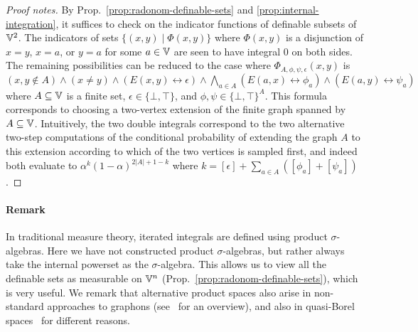 \begin{proof}[Proof notes]
  By Prop.~\ref{prop:radonom-definable-sets} and \ref{prop:internal-integration}, it suffices to check on the indicator functions of definable subsets of $\mathbb{V}^2$.
  The indicators of sets $\{(x,y) \mid \Phi(x,y)\}$ where $\Phi(x,y)$ is a disjunction of $x = y$, $x = a$, or $y = a$ for some $a \in \mathbb{V}$ are seen to have integral $0$ on both sides.
  The remaining possibilities can be reduced to 
  the case where $\Phi_{A,\phi,\psi,\epsilon}(x,y)$ is $(x,y \notin A) \wedge (x \neq y) \wedge (E(x,y) \leftrightarrow \epsilon) \wedge \bigwedge_{a \in A} (E(a,x) \leftrightarrow \phi_a) \wedge (E(a,y) \leftrightarrow \psi_a)$
  where $A \subseteq \mathbb{V}$ is a finite set, $\epsilon \in \{\bot,\top\}$, and $\phi,\psi \in \{\bot,\top\}^A$.
  This formula corresponds to choosing a two-vertex extension of the finite graph spanned by $A \subseteq \mathbb{V}$.
  Intuitively, the two double integrals correspond to the two alternative two-step computations of the conditional probability of extending the graph $A$ to this extension according to which of the two vertices is sampled first, and indeed both evaluate to $α^k (1-α)^{2|A|+1 - k}$ where $k = [\epsilon] + \sum_{a \in A} ([\phi_a] + [\psi_a])$.
\end{proof}

\paragraph*{Remark} In traditional measure theory, iterated integrals are defined using product $\sigma$-algebras. Here we have not constructed product $\sigma$-algebras, but rather always take the internal powerset as the $\sigma$-algebra. This allows us to view all the definable sets as measurable on $\mathbb{V}^n$ (Prop.~\ref{prop:radonom-definable-sets}), which is very useful. We remark that alternative product spaces also arise in non-standard approaches to graphons (see~\cite[\S6]{tao-graphons} for an overview), and also in quasi-Borel spaces~\cite{qbs} for different reasons.

